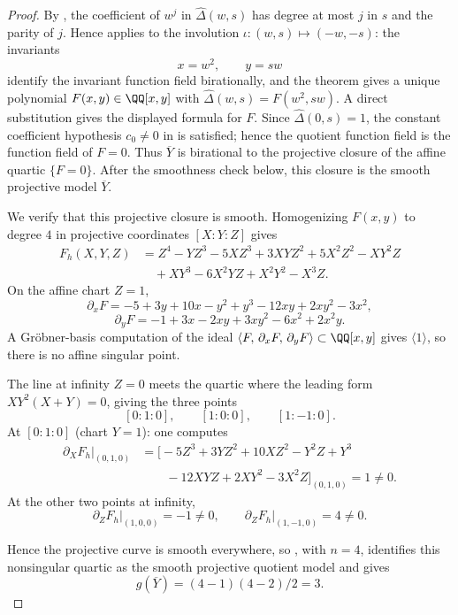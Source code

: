 \begin{proof}

By , the coefficient of \(w^j\) in
\(\widehat\Delta(w,s)\) has degree at most \(j\) in \(s\) and the
parity of \(j\). Hence
 applies to the involution
\(\iota:(w,s)\mapsto(-w,-s)\): the invariants
\[
  x=w^2,\qquad y=sw
\]
identify the invariant function field birationally, and the theorem
gives a unique polynomial \(F(x,y)\in\QQ[x,y]\) with
\(\widehat\Delta(w,s)=F(w^2,sw)\).
A direct substitution gives the displayed formula for \(F\). Since
\(\widehat\Delta(0,s)=1\), the constant coefficient hypothesis
\(c_0\ne0\) in  is satisfied; hence
the quotient function field is the function field of \(F=0\). Thus
\(\overline{Y}\) is birational to the projective closure of the affine
quartic \(\{F=0\}\).
After the smoothness check below, this closure is the smooth projective
model \(\overline{Y}\).

We verify that this projective closure is smooth. Homogenizing
\(F(x,y)\) to degree \(4\) in projective coordinates \([X:Y:Z]\) gives
\[
\begin{aligned}
  F_h(X,Y,Z)
  &= Z^4 - YZ^3 - 5XZ^3 + 3XYZ^2 + 5X^2Z^2 - XY^2Z \\
  &\quad + XY^3 - 6X^2YZ + X^2Y^2 - X^3Z .
\end{aligned}
\]
On the affine chart \(Z=1\),
\[
  \partial_x F
  =-5+3y+10x-y^2+y^3-12xy+2xy^2-3x^2,
\]
\[
  \partial_y F
  =-1+3x-2xy+3xy^2-6x^2+2x^2y.
\]
A Gr\"obner-basis computation of the ideal
\(\langle F,\,\partial_x F,\,\partial_y F\rangle\subset\QQ[x,y]\)
gives \(\langle 1\rangle\), so there is no affine singular point.

The line at infinity \(Z=0\) meets the quartic where the leading form
\(XY^2(X+Y)=0\), giving the three points
\[
  [0:1:0],\qquad [1:0:0],\qquad [1:-1:0].
\]
At \([0:1:0]\) (chart \(Y=1\)): one computes
\[
\begin{aligned}
  \partial_X F_h\big|_{(0,1,0)}
  &=
  \bigl[-5Z^3+3YZ^2+10XZ^2-Y^2Z+Y^3 \\
  &\qquad -12XYZ+2XY^2-3X^2Z\bigr]_{(0,1,0)}
  = 1\neq 0 .
\end{aligned}
\]
At the other two points at infinity,
\[
  \partial_Z F_h\big|_{(1,0,0)}=-1\neq 0,
  \qquad
  \partial_Z F_h\big|_{(1,-1,0)}=4\neq 0 .
\]

Hence the projective curve is smooth everywhere, so
, with \(n=4\), identifies this
nonsingular quartic as the smooth projective quotient model and gives
\[
  g(\overline{Y})=(4-1)(4-2)/2=3.
\]

\end{proof}

